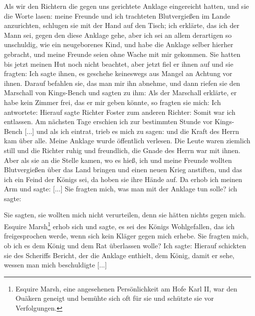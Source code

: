Als wir den Richtern die gegen uns gerichtete Anklage eingereicht 
hatten, und sie die Worte lasen: meine Freunde und ich
trachteten Blutvergießen im Lande anzurichten, schlugen sie mit
der Hand auf den Tisch; ich erklärte, das ich der Mann sei,
gegen den diese Anklage gehe, aber ich sei an allem derartigen
so unschuldig, wie ein neugeborenes Kind, und habe die Anklage
selber hierher gebracht, und meine Freunde seien ohne Wache mit
mir gekommen. Sie hatten bis jetzt meinen Hut noch nicht
beachtet, aber jetzt fiel er ihnen auf und sie fragten:  Ich sagte ihnen, es geschehe keineswegs
aus Mangel an Achtung vor ihnen. Darauf befahlen sie, das
man mir ihn abnehme, und dann riefen sie den Marschall von
Kings-Bench und sagten zu ihm:  Als der Marschall erklärte, er
habe kein Zimmer frei, das er mir geben könnte, so fragten sie
mich:  Ich antwortete:  Hierauf sagte Richter Foster zum anderen Richter:
 Somit war ich entlassen. Am nächsten Tage erschien
ich zur bestimmten Stunde vor Kings-Bench [...] und als ich
eintrat, trieb es mich zu sagen:  und die
Kraft des Herrn kam über alle. Meine Anklage wurde öffentlich
verlesen. Die Leute waren ziemlich still und die Richter ruhig
und freundlich, die Gnade des Herrn war mit ihnen. Aber als
sie an die Stelle kamen, wo es hieß, ich und meine Freunde
wollten Blutvergießen über das Land bringen und einen neuen
Krieg anstiften, und das ich ein Feind der Königs sei, da hoben
sie ihre Hände auf. Da erhob ich meinen Arm und sagte:  [...]
Sie fragten mich, was man mit der Anklage tun solle? ich sagte:

Sie sagten, sie wollten mich nicht verurteilen, denn sie hätten
nichts gegen mich. Esquire Marsh\footnote{Esquire Marsh, eine 
angesehenen Persönlichkeit am Hofe Karl II, war den
Ouäkern geneigt und bemühte sich oft für sie und schützte sie vor 
Verfolgungen.} erhob sich und sagte, es sei
des Königs Wohlgefallen, das ich freigesprochen werde, wenn sich
kein Kläger gegen mich erhebe. Sie fragten mich, ob ich es dem
König und dem Rat überlassen wolle? Ich sagte: 
Hierauf schickten sie des Scheriffs Bericht, der die Anklage enthielt,
dem König, damit er sehe, wessen man mich beschuldigte [...]

